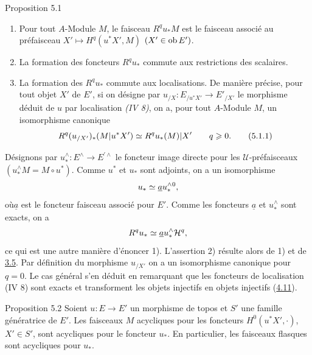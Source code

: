 \documentclass[10pt]{../fichiers-configuration-latex/smfart}
\begin{document}
\begin{enonce*}{Proposition 5.1}
\begin{enumerate}
\renewcommand{\labelenumi}{\theenumi)}
\item Pour tout $A$-Module $M$, le faisceau  $R^qu_\ast M$ est le
  faisceau associé au préfaisceau $X' \mapsto H^q(u^\ast X', M)$ $(X'
  \in \operatorname{ob} E')$.

\item La formation des foncteurs $R^{q}u_{\ast}$ commute aux
  restrictions des scalaires.

\item La formation des $R^qu_\ast$ commute aux
  localisations. De manière précise, pour tout objet $X'$ de $E'$,
  si on désigne par $u_{/X} : E_{/u^{\ast}X'} \to E'_{/X'}$ le
  morphisme déduit de $u$ par localisation \emph{(IV 8)}, on a, pour tout
  $A$-Module $M$, un isomorphisme canonique
\begin{equation*}
R^q(u_{/X'})_\ast (M |u^\ast X') \simeq  R^qu_\ast (M) | X' \qquad q \geqslant
0{}.\tag{5.1.1}
\end{equation*}
\end{enumerate}
\end{enonce*}

Désignons par $u^{\wedge}_\ast :
E^{\wedge} \to E^{\prime\wedge}$ le foncteur
image directe pour les $𝒰$-préfaisceaux
$(u^{\wedge}_\ast M = M ∘ u^{\ast})$.
Comme $u^\ast$ et $u_\ast$ sont adjoints, on a un
isomorphisme
$$
u_\ast \simeq \underline{a} u^{\wedge}_\ast {}^{0}{\quoi}, %
$$
où\pageoriginale $\underline{a}$ est le foncteur faisceau associé pour
$E'$. Comme les
foncteurs $\underline{a}$ et $u^{\wedge}_\ast$ sont exacts, on a
$$
R^q u_\ast\simeq \underline{a}
u^{\wedge}_\ast{\mathcal H}^q{},
$$
ce qui est une autre manière d'énoncer 1). L'assertion 2) résulte
alors de 1) et de \hyperref[V.cor3.5]{3.5}. Par définition du morphisme
$u_{/X'}$ on a un isomorphisme canonique  pour $q = 0$. Le
cas général s'en déduit en remarquant que les foncteurs de
localisation (IV 8) sont exacts et transforment les objets injectifs
en objets injectifs (\hyperref[V.prop4.11]{4.11}).

\begin{enonce*}{Proposition 5.2}
Soient $u : E \to E'$ un morphisme de topos et $S'$ une famille
génératrice de $E'$. Les faisceaux $M$ acycliques pour les
foncteurs $H^{0}(u^\ast X', ⋅)$, $X' \in S'$, sont acycliques pour le
foncteur $u_\ast$. En particulier, les faisceaux flasques sont acycliques
pour $u_\ast$.
\end{enonce*}
\end{document}
